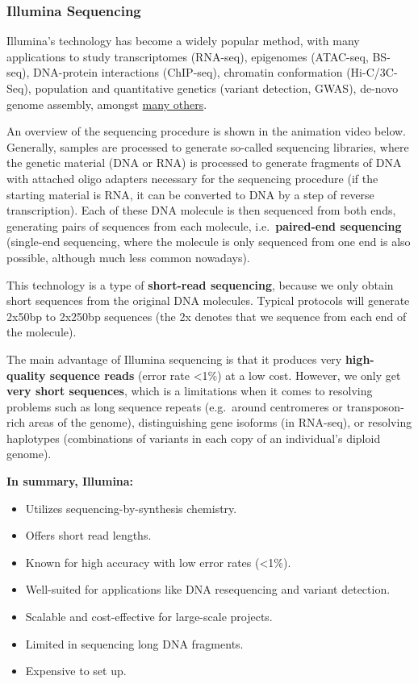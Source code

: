 \documentclass[
]{article}
\providecommand{\tightlist}{%
  \setlength{\itemsep}{0pt}\setlength{\parskip}{0pt}}
\begin{document}
\subsubsection{Illumina Sequencing}\label{illumina-sequencing}

Illumina's technology has become a widely popular method, with many
applications to study transcriptomes (RNA-seq), epigenomes (ATAC-seq,
BS-seq), DNA-protein interactions (ChIP-seq), chromatin conformation
(Hi-C/3C-Seq), population and quantitative genetics (variant detection,
GWAS), de-novo genome assembly, amongst
\href{https://emea.illumina.com/content/dam/illumina-marketing/documents/products/research_reviews/sequencing-methods-review.pdf}{many
others}.

An overview of the sequencing procedure is shown in the animation video
below. Generally, samples are processed to generate so-called sequencing
libraries, where the genetic material (DNA or RNA) is processed to
generate fragments of DNA with attached oligo adapters necessary for the
sequencing procedure (if the starting material is RNA, it can be
converted to DNA by a step of reverse transcription). Each of these DNA
molecule is then sequenced from both ends, generating pairs of sequences
from each molecule, i.e.~\textbf{paired-end sequencing} (single-end
sequencing, where the molecule is only sequenced from one end is also
possible, although much less common nowadays).

This technology is a type of \textbf{short-read sequencing}, because we
only obtain short sequences from the original DNA molecules. Typical
protocols will generate 2x50bp to 2x250bp sequences (the 2x denotes that
we sequence from each end of the molecule).

The main advantage of Illumina sequencing is that it produces very
\textbf{high-quality sequence reads} (error rate \textless1\%) at a low
cost. However, we only get \textbf{very short sequences}, which is a
limitations when it comes to resolving problems such as long sequence
repeats (e.g.~around centromeres or transposon-rich areas of the
genome), distinguishing gene isoforms (in RNA-seq), or resolving
haplotypes (combinations of variants in each copy of an individual's
diploid genome).

\textbf{In summary, Illumina:}

\begin{itemize}
\tightlist
\item
  Utilizes sequencing-by-synthesis chemistry.
\item
  Offers short read lengths.
\item
  Known for high accuracy with low error rates (\textless1\%).
\item
  Well-suited for applications like DNA resequencing and variant
  detection.
\item
  Scalable and cost-effective for large-scale projects.
\item
  Limited in sequencing long DNA fragments.
\item
  Expensive to set up.
\end{itemize}
\end{document}

